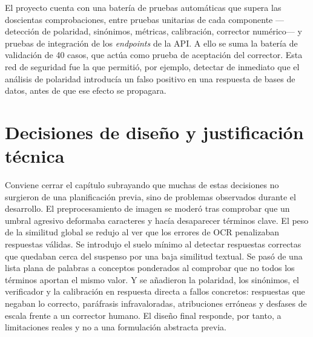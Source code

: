 El proyecto cuenta con una batería de pruebas automáticas que supera las doscientas comprobaciones, entre pruebas unitarias de cada componente —detección de polaridad, sinónimos, métricas, calibración, corrector numérico— y pruebas de integración de los \emph{endpoints} de la API. A ello se suma la batería de validación de 40 casos, que actúa como prueba de aceptación del corrector. Esta red de seguridad fue la que permitió, por ejemplo, detectar de inmediato que el análisis de polaridad introducía un falso positivo en una respuesta de bases de datos, antes de que ese efecto se propagara.

\section{Decisiones de diseño y justificación técnica}

Conviene cerrar el capítulo subrayando que muchas de estas decisiones no surgieron de una planificación previa, sino de problemas observados durante el desarrollo. El preprocesamiento de imagen se moderó tras comprobar que un umbral agresivo deformaba caracteres y hacía desaparecer términos clave. El peso de la similitud global se redujo al ver que los errores de OCR penalizaban respuestas válidas. Se introdujo el suelo mínimo al detectar respuestas correctas que quedaban cerca del suspenso por una baja similitud textual. Se pasó de una lista plana de palabras a conceptos ponderados al comprobar que no todos los términos aportan el mismo valor. Y se añadieron la polaridad, los sinónimos, el verificador y la calibración en respuesta directa a fallos concretos: respuestas que negaban lo correcto, paráfrasis infravaloradas, atribuciones erróneas y desfases de escala frente a un corrector humano. El diseño final responde, por tanto, a limitaciones reales y no a una formulación abstracta previa.
